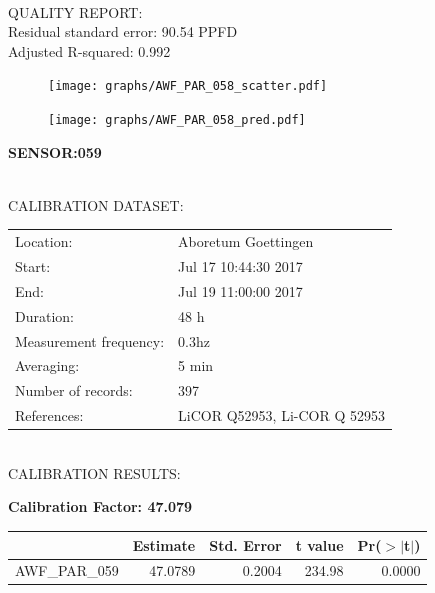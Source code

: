 \documentclass[oneside]{report}
\begin{document}
\hrulefill\\
QUALITY REPORT:\\
Residual standard error: 90.54 PPFD\\
Adjusted R-squared: 0.992



\begin{figure}[H]
  \centering
  \texttt{[image: graphs/AWF\_PAR\_058\_scatter.pdf]}
\end{figure}




\begin{figure}[H]
  \centering
  \texttt{[image: graphs/AWF\_PAR\_058\_pred.pdf]}
\end{figure}

\pagebreak


\begin{center}
\large{\textbf{SENSOR:059}}\\
\end{center}

\hrulefill\\
CALIBRATION DATASET:\\
\begin{table}[h!]
  \centering
  \label{tab:table1}
  \begin{tabular}{ll}
    Location: & Aboretum Goettingen\\ 
    
    
    Start:  & Jul 17 10:44:30 2017 \\
    End:   & Jul 19 11:00:00 2017\\ 
    Duration: & 48 h\\
    Measurement frequency: & 0.3hz\\
    Averaging:  &5 min\\
    Number of records: & 397 \\
    References: & LiCOR Q52953, Li-COR Q 52953 \\
  \end{tabular}
\end{table}

\hrulefill\\
CALIBRATION RESULTS:\\


\begin{center}
\textbf{\large{Calibration Factor: 47.079}}\\
\end{center}
\begin{table}[ht]
\centering
\begin{tabular}{rrrrr}
  \hline
 & Estimate & Std. Error & t value & Pr($>$$|$t$|$) \\ 
  \hline
AWF\_PAR\_059 & 47.0789 & 0.2004 & 234.98 & 0.0000 \\ 
   \hline
\end{tabular}
\end{table}
\end{document}
